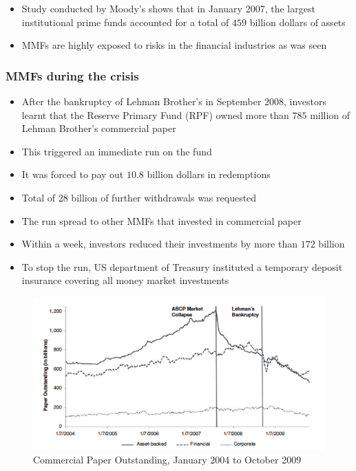 \documentclass[11pt]{beamer}
\begin{document}
\begin{frame}
\begin{itemize}
\item Study conducted by Moody's shows that in January 2007, the largest institutional prime funds accounted for a total of $459$ billion dollars of assets
\item MMFs are highly exposed to risks in the financial industries as was seen
\end{itemize}
\end{frame}

\begin{frame}
\frametitle{MMFs during the crisis}
\begin{itemize}
\item  After the bankruptcy of Lehman Brother's in September 2008, investors learnt that the Reserve Primary Fund (RPF) owned more than $785$ million of Lehman Brother's commercial paper
\item This triggered an immediate run on the fund
\item It was forced to pay out $10.8$ billion dollars in redemptions
\item Total of $28$ billion of further withdrawals was requested
\item The run spread to other MMFs that invested in commercial paper
\item Within a week, investors reduced their investments by more than $172$ billion
\item To stop the run, US department of Treasury instituted a temporary deposit insurance covering all money market investments
\end{itemize}
\end{frame}

\begin{frame}
\begin{figure}
\includegraphics[width=\textwidth]{10_3.png}
\caption{Commercial Paper Outstanding, January 2004 to October 2009}
\end{figure}
\end{frame}
\end{document}
